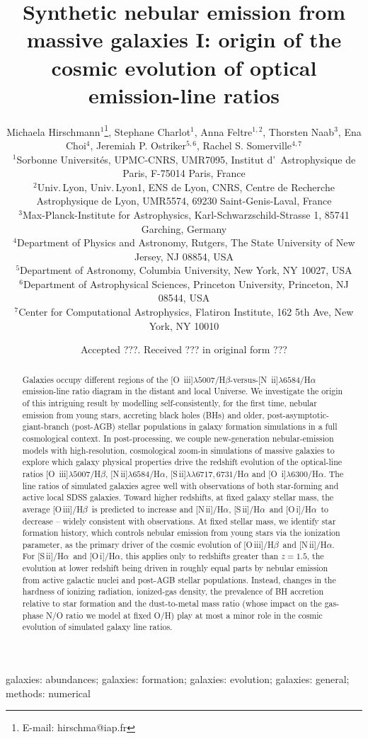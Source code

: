 \documentclass[fleqn,usenatbib]{mnras}
\title[Synthetic nebular emission] 
{Synthetic nebular emission from massive galaxies I: origin of the cosmic evolution 
  of optical emission-line ratios}
\author[Hirschmann et al.]{Michaela Hirschmann$^{1}$\thanks{E-mail:
hirschma@iap.fr}, Stephane Charlot$^{1}$, Anna Feltre$^{1,2}$, Thorsten Naab$^{3}$,
\newauthor Ena Choi$^{4}$, Jeremiah P. Ostriker$^{5,6}$, Rachel S. Somerville$^{4,7}$ \\
$^{1}$Sorbonne Universit\'es, UPMC-CNRS, UMR7095, Institut d'~Astrophysique de Paris, F-75014
Paris, France\\ 
$^{2}$Univ.\,Lyon, Univ.\,Lyon1, ENS de Lyon, CNRS, Centre de Recherche Astrophysique de Lyon, UMR5574, 69230 Saint-Genis-Laval, France\\
$^{3}$Max-Planck-Institute for Astrophysics,
Karl-Schwarzschild-Strasse 1, 85741 Garching, Germany \\
$^{4}$Department of Physics and Astronomy, Rutgers, The State
University of New Jersey, NJ 08854, USA \\
$^{5}$Department of Astronomy, Columbia University, New York, NY 10027, USA \\
$^{6}$Department of Astrophysical Sciences, Princeton University,
Princeton, NJ 08544, USA\\
$^{7}$Center for Computational Astrophysics, Flatiron Institute, 162 5th Ave, New York, NY 10010 \\
}
\newcommand{\oiiihb}{\hbox{[O\,{\sc iii}]/H$\beta$}}
\newcommand{\niiha}{\hbox{[N\,{\sc ii}]/H$\alpha$}}
\newcommand{\siiha}{\hbox{[S\,{\sc ii}]/H$\alpha$}}
\newcommand{\oiha}{\hbox{[O\,{\sc i}]/H$\alpha$}}
\begin{document}
\date{Accepted ???. Received ??? in original form ???}

\pagerange{\pageref{firstpage}--\pageref{lastpage}} 

\maketitle

\label{firstpage}

\begin{abstract}
Galaxies occupy different regions of the [O\,{\sc
  iii}]$\lambda5007$/H$\beta$-versus-[N\,{\sc
  ii}]$\lambda6584$/H$\alpha$ emission-line ratio diagram in the
distant and local Universe. We investigate the origin of this
intriguing result by modelling self-consistently, for
the first time, nebular emission from young stars, accreting black
holes (BHs) and older, post-asymptotic-giant-branch (post-AGB) stellar
populations in galaxy formation simulations in a full cosmological
context. In post-processing, we couple new-generation nebular-emission
models with high-resolution,  cosmological zoom-in simulations of
massive galaxies to explore which galaxy physical properties drive the
redshift evolution of the optical-line ratios [O\,{\sc
  iii}]$\lambda5007$/H$\beta$,  [N\,{\sc ii}]$\lambda6584$/H$\alpha$,
[S\,{\sc ii}]$\lambda\lambda6717,6731$/H$\alpha$ and  [O\,{\sc
  i}]$\lambda6300$/H$\alpha$. The line ratios of simulated galaxies
agree well with observations of both star-forming and active local
SDSS galaxies. Toward higher redshifts, at fixed galaxy stellar mass,
the average \oiiihb\ is predicted to increase and \niiha, \siiha\ and
\oiha\ to decrease -- widely consistent with observations. At fixed
stellar mass, we identify star formation history, which controls
nebular emission from young stars via the ionization parameter, as the
primary driver of the cosmic evolution of \oiiihb\ and \niiha.  For
\siiha\ and \oiha, this applies only to redshifts greater than
$z=1.5$, the evolution at lower redshift being driven in roughly equal
parts by nebular emission from active galactic nuclei and post-AGB  stellar
populations. Instead, changes in the hardness of ionizing radiation,
ionized-gas density, the prevalence of BH accretion relative
to star formation and the dust-to-metal mass ratio (whose impact 
on the gas-phase N/O ratio we model at fixed O/H) play at
most a minor role in the cosmic evolution of simulated galaxy line
ratios.   
\end{abstract}

\begin{keywords}
galaxies: abundances; galaxies: formation; galaxies: evolution;
galaxies: general; methods: numerical
\end{keywords}
\end{document}
